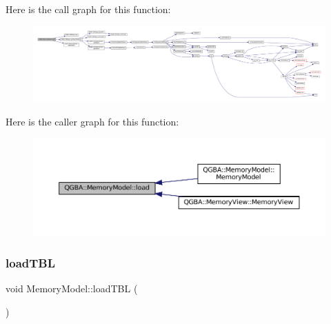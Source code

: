 Here is the call graph for this function\+:
\nopagebreak
\begin{figure}[H]
\begin{center}
\leavevmode
\includegraphics[width=350pt]{class_q_g_b_a_1_1_memory_model_a0bb208ac899a5d6114c24bf2dcd73955_cgraph}
\end{center}
\end{figure}
Here is the caller graph for this function\+:
\nopagebreak
\begin{figure}[H]
\begin{center}
\leavevmode
\includegraphics[width=350pt]{class_q_g_b_a_1_1_memory_model_a0bb208ac899a5d6114c24bf2dcd73955_icgraph}
\end{center}
\end{figure}
\mbox{\label{class_q_g_b_a_1_1_memory_model_a39b4c0fbfcdf26243af77bed0223c811}} 
\subsubsection{\texorpdfstring{load\+T\+BL}{loadTBL}}
{\footnotesize\ttfamily void Memory\+Model\+::load\+T\+BL (\begin{DoxyParamCaption}{ }\end{DoxyParamCaption})\hspace{0.3cm}{\ttfamily [slot]}}

